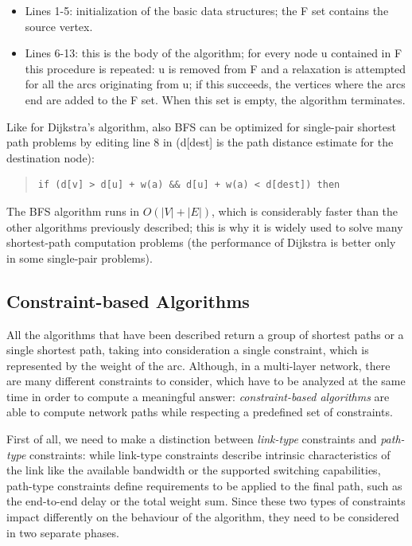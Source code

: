 \documentclass[10pt,a4paper]{report}
\begin{document}
\begin{itemize}
\item Lines 1-5: initialization of the basic data structures; the F
  set contains the source vertex.
\item Lines 6-13: this is the body of the algorithm; for every node u
  contained in F this procedure is repeated: u is removed from F and a
  relaxation is attempted for all the arcs originating from u; if this
  succeeds, the vertices where the arcs end are added to the F
  set. When this set is empty, the algorithm terminates.
\end{itemize}

Like for Dijkstra's algorithm, also BFS can be optimized for
single-pair shortest path problems by editing line 8 in (d[dest] is the
path distance estimate for the destination node):
\begin{quote}
\begin{verbatim}
if (d[v] > d[u] + w(a) && d[u] + w(a) < d[dest]) then
\end{verbatim}
\end{quote}

The BFS algorithm runs in \(O(|V|+|E|)\), which is considerably faster
than the other algorithms previously described; this is why it is
widely used to solve many shortest-path computation problems (the
performance of Dijkstra is better only in some single-pair problems).

\subsection{Constraint-based Algorithms}

All the algorithms that have been described return a group of shortest
paths or a single shortest path, taking into consideration a single
constraint, which is represented by the weight of the arc. Although,
in a multi-layer network, there are many different constraints to
consider, which have to be analyzed at the same time in order to
compute a meaningful answer: \textit{constraint-based algorithms} are
able to compute network paths while respecting a predefined set of
constraints.

First of all, we need to make a distinction between \textit{link-type}
constraints and \textit{path-type} constraints: while link-type
constraints describe intrinsic characteristics of the link like the
available bandwidth or the supported switching capabilities, path-type
constraints define requirements to be applied to the final path, such
as the end-to-end delay or the total weight sum. Since these two types
of constraints impact differently on the behaviour of the algorithm,
they need to be considered in two separate phases.
\end{document}
